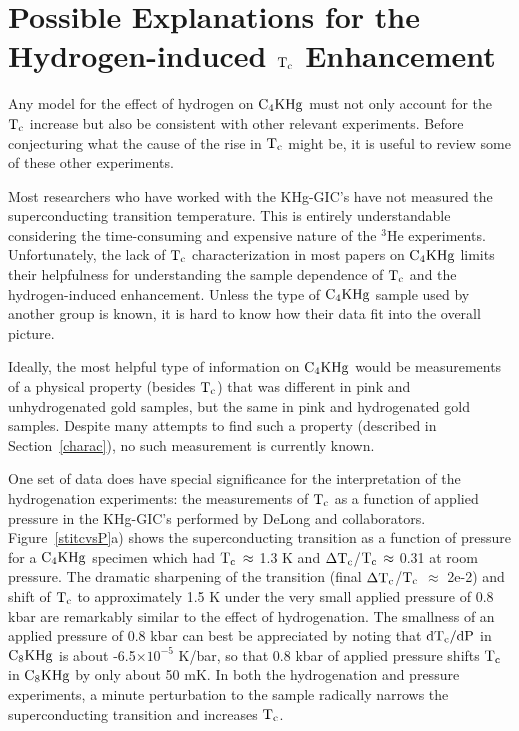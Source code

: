 \section{Possible Explanations for the Hydrogen-induced $\rm T_c$ Enhancement}
\label{hyddisc}

        Any model for the effect of hydrogen on $\rm C_4KHg$  must not only
account  for   the $\rm T_c$   increase but also  be  consistent with other
relevant experiments.  Before conjecturing  what the cause  of the  rise in
$\rm T_c$ might be, it is useful to review some of these other experiments.

        Most   researchers who   have worked with the  KHg-GIC's   have not
measured   the superconducting transition  temperature.    This is entirely
understandable considering  the time-consuming and expensive nature  of the
$^3$He experiments.  Unfortunately, the lack of $\rm  T_c$ characterization
in most papers on $\rm C_4KHg$  limits their helpfulness  for understanding
the sample dependence  of $\rm T_c$  and the  hydrogen-induced enhancement.
Unless the type  of $\rm C_4KHg$ sample used  by another group is known, it
is hard to know how their data fit into the overall picture.

        Ideally, the most helpful type of information on $\rm C_4KHg$ would
be measurements  of   a  physical  property (besides $\rm  T_c$)   that was
different in pink and unhydrogenated gold samples, but the same in pink and
hydrogenated gold  samples.  Despite many  attempts to find such a property
(described in  Section~\ref{charac}),  no  such  measurement  is  currently
known.

        One    set  of   data  does  have   special significance    for the
interpretation  of the hydrogenation  experiments: the measurements of $\rm
T_c$ as a function of applied pressure in the KHg-GIC's performed by DeLong
and                        collaborators.\cite{delong82,delong82a,delong83}
Figure~\ref{stitcvsP}a) shows the superconducting transition  as a function
of pressure for a $\rm C_4KHg$ specimen which had $\rm  T_c \: \approx$ 1.3
K and $\rm  \Delta T_c$/$\rm  T_c \, \approx$ 0.31  at room pressure.   The
dramatic sharpening  of  the transition (final  $\rm  \Delta T_c$/$\rm T_c$
$\approx$ 2e-2) and shift  of $\rm T_c$ to  approximately  1.5  K under the
very  small applied pressure  of  0.8 kbar  are remarkably similar  to  the
effect of hydrogenation.  The smallness of an applied  pressure of 0.8 kbar
can  best be appreciated  by noting that $\rm dT_c/dP$  in $\rm  C_8KHg$ is
about -6.5$\times 10  ^{-5}$ K/bar,\cite{delong82a}  so that  0.8  kbar  of
applied pressure shifts $\rm T_c$ in $\rm C_8KHg$ by only  about 50 mK.  In
both the hydrogenation and pressure  experiments,  a minute perturbation to
the sample radically  narrows the superconducting transition  and increases
$\rm T_c$.

